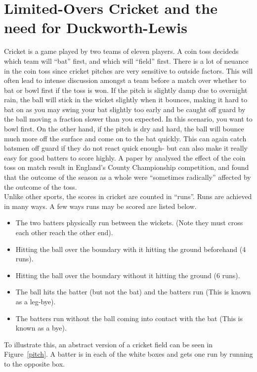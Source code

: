 \section{Limited-Overs Cricket and the need for Duckworth-Lewis}
Cricket is a game played by two teams of eleven players. A coin toss decideds which team will ``bat'' first, and which will ``field'' first. There is a lot of neuance in the coin toss since cricket pitches 
are very sensitive to outside factors. This will often lead to intense discussion amongst a team before a match over whether to bat or bowl first if the toss is won. If the pitch is slightly 
damp due to overnight rain, the ball will stick in the wicket slightly when it bounces, making it hard to bat on as you may swing your bat slightly too early and be caught 
off guard by the ball moving a fraction slower than you expected. In this scenario, you want to bowl first. On the other hand, if the pitch is dry and hard, the ball will bounce much more off the surface and come on to the bat 
quickly. This can again catch batsmen off guard if they do not react quick enough- but can also make it really easy for good batters to score highly. A paper by \cite{tosseffect} analysed the effect of the coin toss 
on match result in England's County Championship competition, and found that the outcome of the season as a whole were ``sometimes radically'' affected by the outcome of the toss. \\

Unlike other sports, the scores in cricket are counted in ``runs''. Runs are achieved in many ways. A few ways runs may be scored are listed below. 

\begin{itemize}
    \item The two batters physically run between the wickets. (Note they must cross each other reach the other end). 
    \item Hitting the ball over the boundary with it hitting the ground beforehand (4 runs). 
    \item Hitting the ball over the boundary without it hitting the ground (6 runs). 
    \item The ball hits the batter (but not the bat) and the batters run (This is known as a leg-bye). 
    \item The batters run without the ball coming into contact with the bat (This is known as a bye).
\end{itemize}

To illustrate this, an abstract version of a cricket field can be seen in Figure~\ref{pitch}. A batter is in each of the white boxes 
and gets one run by running to the opposite box. 

